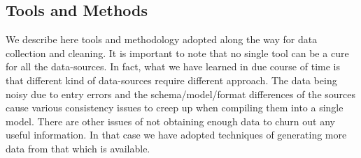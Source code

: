\subsection{Tools and Methods}

We describe here tools and methodology adopted along the way for data collection and cleaning. It is important to note that no single tool can be a cure for all the data-sources. In fact, what we have learned in due course of time is that different kind of data-sources require different approach.
The data being noisy due to entry errors and the schema/model/format differences of the sources cause various consistency issues to creep up when compiling them into a single model. There are other issues of not obtaining enough data to churn out any useful information. In that case we have adopted techniques of generating more data from that which is available.

